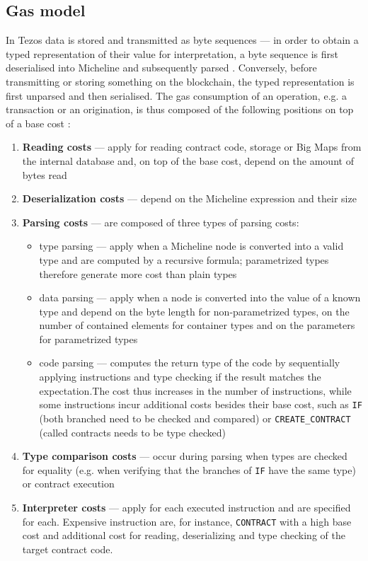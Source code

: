 \subsection{Gas model}
In Tezos data is stored and transmitted as byte sequences --- in order to obtain a typed representation of their value for interpretation, a byte sequence is first deserialised into Micheline and subsequently parsed \cite{tezos_repo}. Conversely, before transmitting or storing something on the blockchain, the typed representation is first unparsed and then serialised. The gas consumption of an operation, e.g. a transaction or an origination, is thus composed of the following positions on top of a base cost \cite{morley_gasmodel}\cite{tezos_repo}:
\begin{enumerate}
\item \textbf{Reading costs} --- apply for reading contract code, storage or Big Maps from the internal database and, on top of the base cost, depend on the amount of bytes read
\item \textbf{Deserialization costs} --- depend on the Micheline expression and their size
\item \textbf{Parsing costs} --- are composed of three types of parsing costs:
	\begin{itemize}
	\item type parsing --- apply when a Micheline node is converted into a valid type and are computed by a recursive formula; parametrized types therefore generate more cost than plain types
	\item data parsing --- apply when a node is converted into the value of a known type and depend on the byte length for non-parametrized types, on the number of contained elements for container types and on the parameters for parametrized types
	\item code parsing --- computes the return type of the code by sequentially applying instructions and type checking if the result matches the expectation.The cost thus increases in the number of instructions, while some instructions incur additional costs besides their base cost, such as \texttt{IF} (both branched need to be checked and compared) or \texttt{CREATE\_CONTRACT} (called contracts needs to be type checked)
	\end{itemize}
\item \textbf{Type comparison costs} --- occur during parsing when types are checked for equality (e.g. when verifying that the branches of \texttt{IF} have the same type) or contract execution
\item \textbf{Interpreter costs} --- apply for each executed instruction and are specified for each. Expensive instruction are, for instance, \texttt{CONTRACT} with a high base cost and additional cost for reading, deserializing and type checking of the target contract code. 

\end{enumerate}
